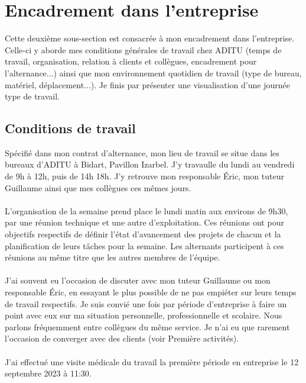 
\section{Encadrement dans l'entreprise}

Cette deuxième sous-section est consacrée à mon encadrement dans l'entreprise. Celle-ci y aborde mes conditions générales de travail chez ADITU (temps de travail, organisation, relation à clients et collègues, encadrement pour l'alternance...) ainsi que mon environnement quotidien de travail (type de bureau, matériel, déplacement...). Je finis par présenter une visualisation d'une journée type de travail. 

\subsection{Conditions de travail}

Spécifié dans mon contrat d'alternance, mon lieu de travail se situe dans les bureaux d'ADITU à Bidart, Pavillon Izarbel. J'y travaulle du lundi au vendredi de 9h à 12h, puis de 14h 18h. J'y retrouve mon responsable Éric, mon tuteur Guillaume ainsi que mes collègues ces mêmes jours.
\\ \\
L'organisation de la semaine prend place le lundi matin aux environs de 9h30, par une réunion technique et une autre d'exploitation. Ces réunions ont pour objectifs respectifs de définir l'état d'avancement des projets de chacun et la planification de leurs tâches pour la semaine. Les alternants participent à ces réunions au même titre que les autres membres de l'équipe.
\\ \\
J'ai souvent eu l'occasion de discuter avec mon tuteur Guillaume ou mon responsable Éric, en essayant le plus possible de ne pas empiéter sur leurs temps de travail respectifs. Je suis convié une fois par période d'entreprise à faire un point avec eux sur ma situation personnelle, professionnelle et scolaire. Nous parlons fréquemment entre collègues du même service. Je n'ai eu que rarement l'occasion de converger avec des clients (voir Première activités).
\\ \\
J'ai effectué une visite médicale du travail la première période en entreprise le 12 septembre 2023 à 11:30.

